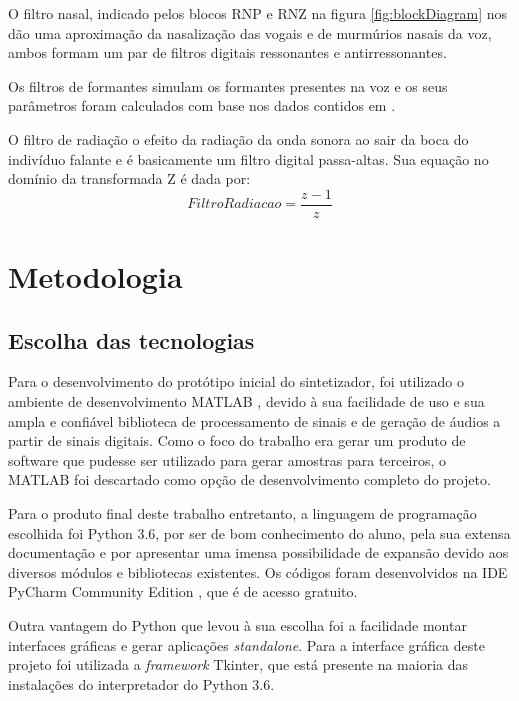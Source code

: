 \documentclass[
  12pt,       
  openright,      
  twoside,      
  a4paper,      
  english,      
  french,       
  spanish,      
  brazil,     
  ]{abntex2}
\begin{document}
O filtro nasal, indicado pelos blocos RNP e RNZ na figura \ref{fig:blockDiagram} nos dão uma aproximação da nasalização das vogais e de murmúrios nasais da voz, ambos formam um par de filtros digitais ressonantes e antirressonantes.

Os filtros de formantes simulam os formantes presentes na voz e os seus parâmetros foram calculados com base nos dados contidos em .

O filtro de radiação o efeito da radiação da onda sonora ao sair da boca do indivíduo falante e é basicamente um filtro digital passa-altas. Sua equação no domínio da transformada Z é dada por:
\begin{equation}
\label{eq:filtroRadiacao}
FiltroRadiacao = \frac{z - 1}{z}
\end{equation}

\chapter{Metodologia}
\section{Escolha das tecnologias}
Para o desenvolvimento do protótipo inicial do sintetizador, foi utilizado o ambiente de desenvolvimento MATLAB \cite{matlab}, devido à sua facilidade de uso e sua ampla e confiável biblioteca de processamento de sinais e de geração de áudios a partir de sinais digitais. Como o foco do trabalho era gerar um produto de software que pudesse ser utilizado para gerar amostras para terceiros, o MATLAB foi descartado como opção de desenvolvimento completo do projeto.

Para o produto final deste trabalho entretanto, a linguagem de programação escolhida foi Python 3.6, por ser de bom conhecimento do aluno, pela sua extensa documentação e por apresentar uma imensa possibilidade de expansão devido aos diversos módulos e bibliotecas existentes. Os códigos foram desenvolvidos na IDE PyCharm Community Edition \cite{pycharm}, que é de acesso gratuito.

Outra vantagem do Python que levou à sua escolha foi a facilidade montar interfaces gráficas e gerar aplicações \textit{standalone}. Para a interface gráfica deste projeto foi utilizada a \textit{framework} Tkinter, que está presente na maioria das instalações do interpretador do Python 3.6.
\end{document}
